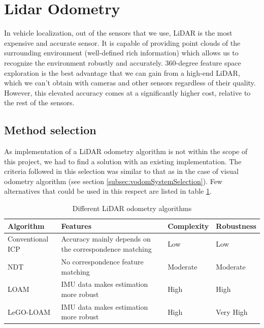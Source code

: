 

\section{Lidar Odometry}
In vehicle localization, out of the sensors that we use, \gls{LiDAR} is the most expensive and accurate sensor. It is capable of providing point clouds of the surrounding environment (well-defined rich information) which allows us to recognize the environment robustly and accurately. 360-degree feature space exploration is the best advantage that we can gain from a high-end \gls{LiDAR}, which we can’t obtain with cameras and other sensors regardless of their quality. However, this elevated accuracy comes at a significantly higher cost, relative to the rest of the sensors.

\subsection{Method selection}
As implementation of a \gls{LiDAR} odometry algorithm is not within the scope of this project, we had to find a solution with an existing implementation. The criteria followed in this selection was similar to that as in the case of visual odometry algorithm (see section \ref{subsec:vodomSystemSelection}). Few alternatives that could be used in this respect are listed in table \ref{table:ha:DifferentLOdomMethods}.
\begin{table}[htp]
	\centering
	\begin{tabular}{|p{}|p{}|p{}|p{}|} 
		\hline
		\textbf{Algorithm} & \textbf{Features} & \textbf{Complexity} & \textbf{Robustness} \\
		\hline
		Conventional \gls{ICP}&Accuracy mainly depends on the correspondence
		matching&Low&Low\\
		\hline
		\gls{NDT}&No correspondence feature matching&Moderate&Moderate\\
		\hline
		\gls{LOAM}&IMU data makes estimation more robust& High & High\\
		\hline
		\gls{LeGO-LOAM}&IMU data makes estimation more robust& High & Very High\\
		\hline
	\end{tabular}
	\caption{Different LiDAR odometry algorithms}
	\label{table:ha:DifferentLOdomMethods}
	\vspace{0.5cm}
\end{table}

